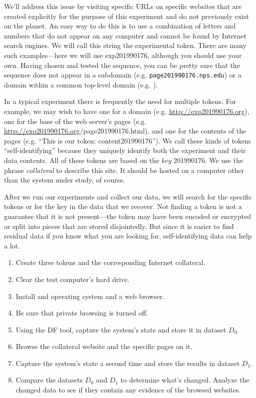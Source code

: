 {We'll address this issue by visiting specific URLs on specific
websites that are created explicitly for the purpose of this
experiment and do not previously exist on the planet. 
An easy way to do this is to use a combination of letters and
numbers that do not appear on any computer and cannot be found by
Internet search engines. We will call this string the experimental
token. There are many such examples---here we will
use exp201990176, although you should use your own. Having chosen and
tested the sequence, you can be pretty sure that the sequence does not
appear in a subdomain (e.g. \texttt{page201990176.nps.edu}) or a domain
  within a common top-level domain (e.g. ).

In a typical experiment there is frequently the need for multiple
tokens. For example, we may wish to have one for a domain
(e.g. \url{http://exp201990176.org}), one for the base of the web
server's pages
(e.g. \url{http://exp201990176.org}/page201990176.html), and one for
the contents of the pages (e.g. ``This is our token:
  content201990176'').  We call these kinds of tokens
  ``self-identifying'' because they uniquely identify both the
  experiment and their data contents. All of these tokens are based on
  the \emph{key} 201990176. We use the phrase
  \emph{collateral} to describe this site. It should be hosted on a
 computer other than the system under study, of course.

After we run our experiments and collect our data, we will search for
the specific tokens or for the key in the data that we recover. Not
finding a token is not a guarantee that it is not present---the token
may have been encoded or encrypted or split into pieces that are
stored disjointedly. But since it is easier to find residual data if
you know what you are looking for, self-identifying data can help a
lot.

\label{protocol:background}
\begin{enumerate}
\item Create three tokens and the corresponding Internet collateral.
\item Clear the test computer's hard drive.
\item Install and operating system and a web browser.
\item Be sure that private browsing is turned off.
\item Using the DF tool, capture the system's state and store it in dataset $D_0$.
\item Browse the collateral website
 and the specific pages on it.
\item Capture the system's state a second time and store the results in dataset $D_1$.
\item Compare the datasets $D_0$ and $D_1$ to determine what's
  changed. Analyze the changed data to see if they contain any
  evidence of the browsed websites. 
\end{enumerate}


}
